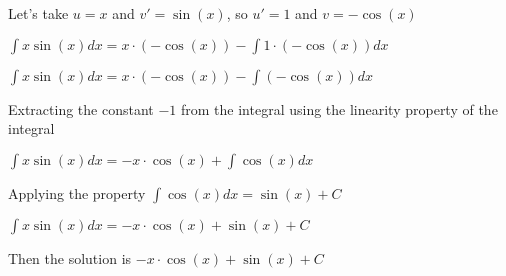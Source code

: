 Let's take $u = x$ and $v' = \sin{(x)}$, so $u' = 1$ and $v = -\cos{(x)}$

\singlespacing

$\int x\sin{(x) }dx = x\cdot (-\cos{(x)}) - \int 1\cdot (-\cos{(x)})dx$

\singlespacing

$\int x\sin{(x) }dx = x\cdot (-\cos{(x)}) - \int (-\cos{(x)})dx$

\singlespacing

Extracting the constant $-1$ from the integral using the linearity property of the integral

\singlespacing

$\int x\sin{(x) }dx = -x\cdot \cos{(x)} + \int \cos{(x)}dx$

\singlespacing

Applying the property $\int \cos{(x)}dx = \sin{(x)} + C$

\singlespacing

$\int x\sin{(x) }dx = -x\cdot \cos{(x)} + \sin{(x)} + C$

\singlespacing

Then the solution is $-x\cdot \cos{(x)} + \sin{(x)} + C$